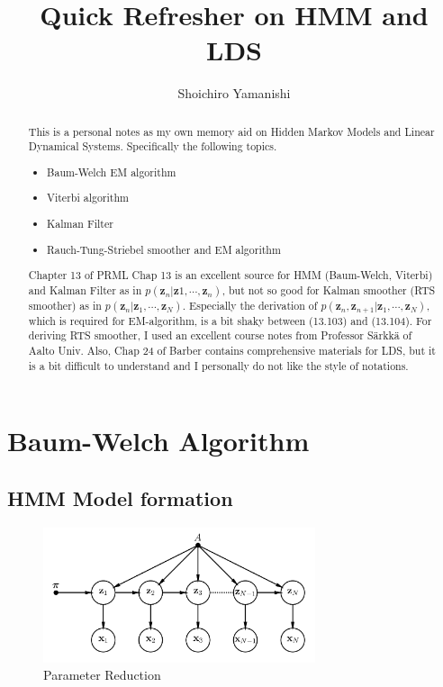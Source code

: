 \documentclass[a4]{article}
\title{Quick Refresher on HMM and LDS}
\author{Shoichiro Yamanishi}
\begin{document}
\maketitle

\begin{abstract}
This is a personal notes as my own memory aid on Hidden Markov Models and Linear Dynamical Systems.
Specifically the following topics.
\begin{itemize}
\item Baum-Welch EM algorithm 
\item Viterbi algorithm
\item Kalman Filter
\item Rauch-Tung-Striebel smoother and EM algorithm
\end{itemize}

Chapter 13 of PRML\cite{bishop2007} Chap 13 is an excellent source for HMM (Baum-Welch, Viterbi)
and Kalman Filter as in $p(\bm{z}_n| \bm{z}1, \cdots, \bm{z}_n)$, but not so good for
Kalman smoother (RTS smoother) as in $p(\bm{z}_n| \bm{z}_1, \cdots, \bm{z}_N)$.
Especially the derivation of  $p(\bm{z}_n, \bm{z}_{n+1}| \bm{z}_1, \cdots, \bm{z}_N)$, 
which is required for EM-algorithm, is a bit shaky between (13.103) and (13.104).
For deriving RTS smoother, I used an excellent course notes \cite{sarkka2011} from Professor S{\"a}rkk{\"a}
of Aalto Univ.
Also, Chap 24 of Barber \cite{Barber2011} contains comprehensive materials for LDS,
but it is a bit difficult to understand and I personally do not like the style of notations.
\end{abstract}

\section{Baum-Welch Algorithm}
\subsection{HMM Model formation}

\begin{figure}[!htb]
\centering
\includegraphics[width=8cm]{chain_discrete.png}
\caption{Parameter Reduction}
\label{fig:chain_discrete}
\end{figure}
\end{document}
